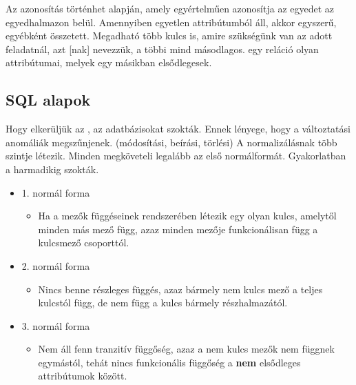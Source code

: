\documentclass[../../main.tex]{subfiles}
\begin{document}
Az azonosítás történhet  alapján, amely egyértelműen
azonosítja az egyedet az egyedhalmazon belül. Amennyiben egyetlen
attribútumból áll, akkor egyszerű, egyébként összetett.
Megadható több kulcs is, amire szükségünk van az adott feladatnál,
azt [nak] nevezzük, a többi mind másodlagos.
 egy reláció olyan attribútumai,
melyek egy másikban elsődlegesek.

\subsection{SQL alapok}

Hogy elkerüljük az , az adatbázisokat
 szokták. Ennek lényege, hogy a
változtatási anomáliák megszűnjenek. (módosítási, beírási,
törlési) A normalizálásnak több szintje létezik.
Minden  megköveteli legalább
az első normálformát. Gyakorlatban a harmadikig szokták.
\begin{itemize}
  \item {1. normál forma}
        \begin{itemize}
          \item Ha a mezők függéseinek rendszerében
                létezik egy olyan kulcs, amelytől minden
                más mező függ, azaz minden mezője
                funkcionálisan függ a kulcsmező csoporttól.
        \end{itemize}

  \item {2. normál forma}
        \begin{itemize}
          \item Nincs benne részleges függés, azaz bármely nem
                kulcs mező a teljes kulcstól függ, de nem függ a
                kulcs bármely részhalmazától.
        \end{itemize}

  \item {3. normál forma}
        \begin{itemize}
          \item Nem áll fenn tranzitív függőség, azaz
                a nem kulcs mezők nem függnek egymástól,
                tehát nincs funkcionális függőség a \textbf{nem}
                elsődleges attribútumok között.
        \end{itemize}
\end{itemize}
\end{document}
